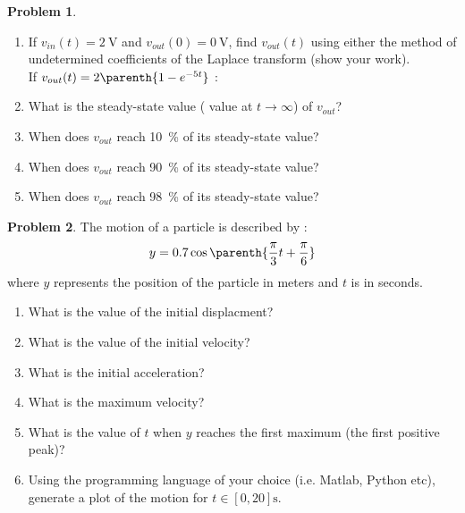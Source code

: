 \documentclass[10pt]{article}
\theoremstyle{definition}
\newtheorem{prob}{Problem}[section]
\newenvironment{subprob}%
{\renewcommand{\theenumi}{\alph{enumi}}\renewcommand{\labelenumi}{(\theenumi)}\begin{enumerate}}%
{\end{enumerate}}%
\begin{document}
\begin{prob}
    \begin{subprob}
    \item If \( v_{in}(t) = \SI{2}{\volt} \) and \( v_{out}(0) = \SI{0}{\volt} \), find \( v_{out}(t) \) using either the method of undetermined coefficients of the Laplace transform (show your work).
        \vspace*{6cm} \\

    If \( v_{out}(t) = 2 \parenth{ 1 -e^{-5 t} }\) :

    \item What is the steady-state value ( value at \( t \to \infty\)) of \( v_{out}\)?

        \vspace*{2cm}
    \item When does \( v_{out} \) reach \SI{10}{\percent} of its steady-state value?
        \vspace*{2cm}
    \item When does \( v_{out} \) reach \SI{90}{\percent} of its steady-state value?
        \vspace*{2cm}
    \item When does \( v_{out} \) reach \SI{98}{\percent} of its steady-state value?
    \end{subprob}
\end{prob}

\clearpage\newpage
\begin{prob}
    The motion of a particle is described by :
    \begin{align*}
        y = 0.7 \cos \parenth{\frac{\pi}{3}t + \frac{\pi}{6}}
    \end{align*}
    where \( y \) represents the position of the particle in meters and \( t \) is in seconds.
    
    \begin{subprob}
    \item What is the value of the initial displacment?
    \item What is the value of the initial velocity?
    \item What is the initial acceleration?
    \item What is the maximum velocity?
    \item What is the value of \( t \) when \( y \) reaches the first maximum (the first positive peak)?
    \item Using the programming language of your choice (i.e. Matlab, Python etc), generate a plot of the motion for \( t \in [0, 20] \si{\second}\).
    \end{subprob}
\end{prob}
\end{document}
